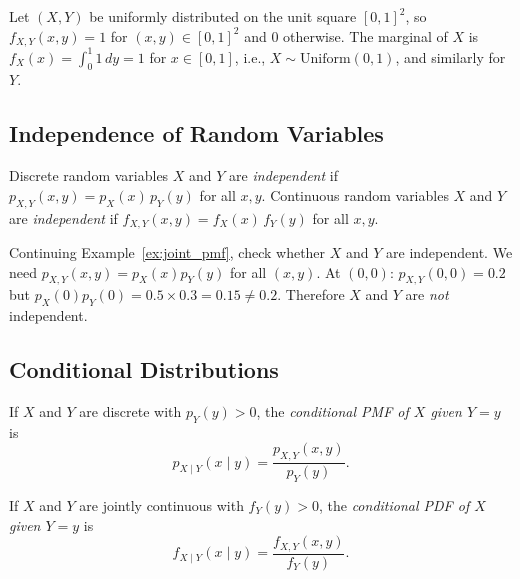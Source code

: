 \documentclass[11pt,a4paper]{article}
\begin{document}
\begin{example}
\label{ex:joint_uniform}
Let $(X, Y)$ be uniformly distributed on the unit square $[0,1]^2$, so
$f_{X,Y}(x,y) = 1$ for $(x,y) \in [0,1]^2$ and $0$ otherwise. The
marginal of $X$ is
$f_X(x) = \int_0^1 1\,dy = 1$ for $x \in [0,1]$,
i.e., $X \sim \mathrm{Uniform}(0,1)$, and similarly for $Y$.
\end{example}

\subsection{Independence of Random Variables}

\begin{definition}
\label{def:rv_independence}
Discrete random variables $X$ and $Y$ are \emph{independent} if
$p_{X,Y}(x, y) = p_X(x) \, p_Y(y)$ for all $x, y$.
Continuous random variables $X$ and $Y$ are \emph{independent} if
$f_{X,Y}(x, y) = f_X(x) \, f_Y(y)$ for all $x, y$.
\end{definition}

\begin{example}
\label{ex:test_independence}
Continuing Example~\ref{ex:joint_pmf}, check whether $X$ and $Y$ are
independent. We need $p_{X,Y}(x,y) = p_X(x) p_Y(y)$ for all $(x,y)$.
At $(0, 0)$: $p_{X,Y}(0,0) = 0.2$ but
$p_X(0) p_Y(0) = 0.5 \times 0.3 = 0.15 \neq 0.2$.
Therefore $X$ and $Y$ are \emph{not} independent.
\end{example}

\subsection{Conditional Distributions}

\begin{definition}
\label{def:cond_pmf}
If $X$ and $Y$ are discrete with $p_Y(y) > 0$, the \emph{conditional
PMF of $X$ given $Y = y$} is
\[
    p_{X \mid Y}(x \mid y)
    = \frac{p_{X,Y}(x, y)}{p_Y(y)}.
\]
\end{definition}

\begin{definition}
\label{def:cond_pdf}
If $X$ and $Y$ are jointly continuous with $f_Y(y) > 0$, the
\emph{conditional PDF of $X$ given $Y = y$} is
\[
    f_{X \mid Y}(x \mid y)
    = \frac{f_{X,Y}(x, y)}{f_Y(y)}.
\]
\end{definition}
\end{document}
